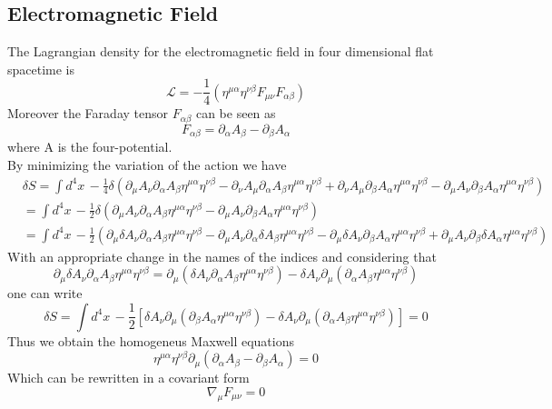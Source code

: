 \documentclass[a4paper,10pt]{article}
\begin{document}
\subsection{Electromagnetic Field}
The Lagrangian density for the electromagnetic field in four dimensional flat spacetime is
\begin{equation}
 \mathcal{L}=-\frac{1}{4} \left( \eta^{\mu \alpha} \eta^{\nu \beta} F_{\mu \nu} F_{\alpha \beta} \right)
\end{equation}
Moreover the Faraday tensor $ F_{\alpha \beta}$ can be seen as
\begin{equation}
 F_{\alpha \beta} = \partial_\alpha A_\beta - \partial_\beta A_\alpha
\end{equation}
where A is the four-potential.\\
By minimizing the variation of the action we have
\begin{equation}
 \begin{align}
  &\delta S= \int{d^4x\, -\frac{1}{4} \delta \left( \partial_\mu A_\nu \partial_\alpha A_\beta \eta^{\mu \alpha} \eta^{\nu \beta}- \partial_\nu A_\mu \partial_\alpha A_\beta \eta^{\mu \alpha} \eta^{\nu \beta}+ \partial_\nu A_\mu \partial_\beta A_\alpha \eta^{\mu \alpha} \eta^{\nu \beta}- \partial_\mu A_\nu \partial_\beta A_\alpha \eta^{\mu \alpha} \eta^{\nu \beta} \right)}\\
  &=\int{d^4x\, -\frac{1}{2} \delta \left( \partial_\mu A_\nu \partial_\alpha A_\beta \eta^{\mu \alpha} \eta^{\nu \beta} - \partial_\mu A_\nu \partial_\beta A_\alpha \eta^{\mu \alpha} \eta^{\nu \beta} \right)}\\
  &=\int{d^4x\, -\frac{1}{2} \left(\partial_\mu \delta A_\nu \partial_\alpha A_\beta \eta^{\mu \alpha} \eta^{\nu \beta} - \partial_\mu A_\nu \partial_\alpha \delta A_\beta \eta^{\mu \alpha} \eta^{\nu \beta}-\partial_\mu \delta A_\nu \partial_\beta A_\alpha \eta^{\mu \alpha} \eta^{\nu \beta} + \partial_\mu A_\nu \partial_\beta \delta A_\alpha \eta^{\mu \alpha} \eta^{\nu \beta} \right)}
 \end{align}
\end{equation}
With an appropriate change in the names of the indices and considering that
\begin{equation}
 \partial_\mu \delta A_\nu \partial_\alpha A_\beta \eta^{\mu \alpha} \eta^{\nu \beta} = \partial_\mu (\delta A_\nu \partial_\alpha A_\beta \eta^{\mu \alpha} \eta^{\nu \beta}) - \delta A_\nu \partial_\mu (\partial_\alpha A_\beta \eta^{\mu \alpha} \eta^{\nu \beta})
\end{equation}
one can write
\begin{equation}
  \delta S= \int{d^4x\, -\frac{1}{2} \left[\delta A_\nu \partial_\mu( \partial_\beta A_\alpha \eta^{\mu \alpha} \eta^{\nu \beta})- \delta A_\nu \partial_\mu ( \partial_\alpha A_\beta \eta^{\mu \alpha} \eta^{\nu \beta}) \right]}=0
\end{equation}
Thus we obtain the homogeneus Maxwell equations
\begin{equation}
 \eta^{\mu \alpha} \eta^{\nu \beta} \partial_\mu(\partial_\alpha A_\beta - \partial_\beta A_\alpha)=0
\end{equation}
Which can be rewritten in a covariant form
\begin{equation}
 \nabla_\mu F_{\mu \nu}=0
\end{equation}
\end{document}
